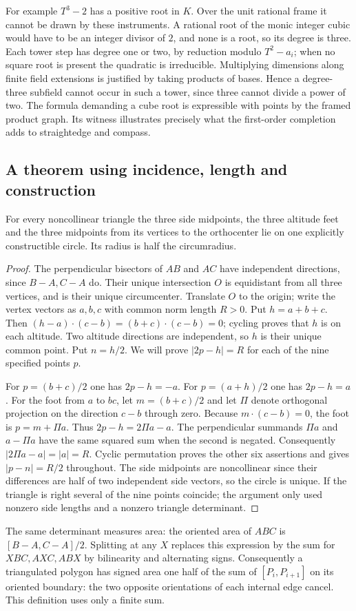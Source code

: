 For example $T^3-2$ has a positive root in $K$. Over the unit rational
frame it cannot be drawn by these instruments. A rational root of the
monic integer cubic would have to be an integer divisor of $2$, and
none is a root, so its degree is three. Each tower step has degree one
or two, by reduction modulo $T^2-a_i$; when no square root is present
the quadratic is irreducible. Multiplying dimensions along finite field
extensions is justified by taking products of bases. Hence a degree-three
subfield cannot occur in such a tower, since three cannot divide a
power of two. The formula demanding a cube root is expressible with
points by the framed product graph. Its witness illustrates precisely
what the first-order completion adds to straightedge and compass.

\subsection{A theorem using incidence, length and construction}
\begin{proposition}
For every noncollinear triangle the three side midpoints, the three
altitude feet and the three midpoints from its vertices to the
orthocenter lie on one explicitly constructible circle. Its radius is
half the circumradius.
\end{proposition}
\begin{proof}
The perpendicular bisectors of $AB$ and $AC$ have independent directions,
since $B-A,C-A$ do. Their unique intersection $O$ is equidistant from
all three vertices, and is their unique circumcenter. Translate $O$
to the origin; write the vertex vectors as $a,b,c$ with common norm
length $R>0$. Put $h=a+b+c$. Then
$(h-a)\cdot(c-b)=(b+c)\cdot(c-b)=0$; cycling proves that $h$ is on
each altitude. Two altitude directions are independent, so $h$ is their
unique common point. Put $n=h/2$. We will prove $|2p-h|=R$ for
each of the nine specified points $p$.

For $p=(b+c)/2$ one has $2p-h=-a$. For $p=(a+h)/2$ one has
$2p-h=a$. For the foot from $a$ to $bc$, let $m=(b+c)/2$ and
let $\Pi$ denote orthogonal projection on the direction $c-b$ through
zero. Because $m\cdot(c-b)=0$, the foot is $p=m+\Pi a$.
Thus $2p-h=2\Pi a-a$. The perpendicular summands $\Pi a$ and
$a-\Pi a$ have the same squared sum when the second is negated.
Consequently $|2\Pi a-a|=|a|=R$. Cyclic permutation proves the other
six assertions and gives $|p-n|=R/2$ throughout. The side midpoints
are noncollinear since their differences are half of two independent
side vectors, so the circle is unique. If the triangle is right several
of the nine points coincide; the argument only used nonzero side
lengths and a nonzero triangle determinant.
\end{proof}

The same determinant measures area: the oriented area of $ABC$ is
$[B-A,C-A]/2$. Splitting at any $X$ replaces this expression by the sum
for $XBC,AXC,ABX$ by bilinearity and alternating signs. Consequently a
triangulated polygon has signed area one half of the sum of
$[P_i,P_{i+1}]$ on its oriented boundary: the two opposite orientations
of each internal edge cancel. This definition uses only a finite sum.
